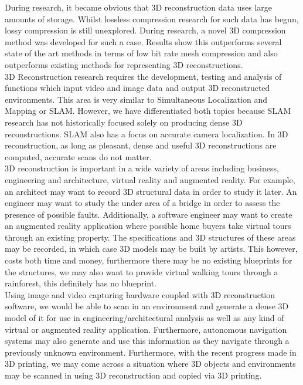 During research, it became obvious that 3D reconstruction data uses large amounts of storage. Whilst lossless compression research for such data has begun, lossy compression is still unexplored. During research, a novel 3D compression method was developed for such a case. Results show this outperforms several state of the art methods in terms of low bit rate mesh compression and also outperforms existing methods for representing 3D reconstructions. \\

3D Reconstruction research requires the development, testing and analysis of functions which input video and image data and output 3D reconstructed environments. This area is very similar to Simultaneous Localization and Mapping or SLAM. However, we have differentiated both topics because SLAM research has not historically focused solely on producing dense 3D reconstructions. SLAM also has a focus on accurate camera localization. In 3D reconstruction, as long as pleasant, dense and useful 3D reconstructions are computed, accurate scans do not matter. \\

3D reconstruction is important in a wide variety of areas including business, engineering and architecture, virtual reality and augmented reality. For example, an architect may want to record 3D structural data in order to study it later. An engineer may want to study the under area of a bridge in order to assess the presence of possible faults. Additionally, a software engineer may want to create an augmented reality application where possible home buyers take virtual tours through an existing property. The specifications and 3D structures of these areas may be recorded, in which case 3D models may be built by artists. This however, costs both time and money, furthermore there may be no existing blueprints for the structures, we may also want to provide virtual walking tours through a rainforest, this definitely has no blueprint. \\

Using image and video capturing hardware coupled with 3D reconstruction software, we would be able to scan in an environment and generate a dense 3D model of it for use in engineering/architectural analysis as well as any kind of virtual or augmented reality application. Furthermore, autonomous navigation systems may also generate and use this information as they navigate through a previously unknown environment. Furthermore, with the recent progress made in 3D printing, we may come across a situation where 3D objects and environments may be scanned in using 3D reconstruction and copied via 3D printing. \\


